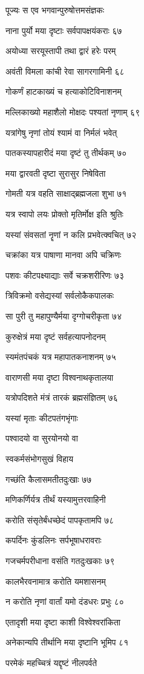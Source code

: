 पूज्यः स एव भगवान्पुरुषोत्तमसंज्ञकः

नाना पुर्यो मया दृष्टाः सर्वपापक्षयंकराः ६७

अयोध्या सरयूस्तापी तथा द्वारं हरेः परम्

अवंती विमला कांची रेवा सागरगामिनी ६८

गोकर्णं हाटकाख्यं च हत्याकोटिविनाशनम्

मल्लिकाख्यो महाशैलो मोक्षदः पश्यतां नृणाम् ६९

यत्रांगेषु नृणां तोयं श्यामं वा निर्मलं भवेत्

पातकस्यापहारीदं मया दृष्टं तु तीर्थकम् ७०

मया द्वारवती दृष्टा सुरासुर निषेविता

गोमती यत्र वहति साक्षाद्ब्रह्मजला शुभा ७१

यत्र स्वापो लयः प्रोक्तो मृतिर्मोक्ष इति श्रुतिः

यस्यां संवसतां नॄणां न कलि प्रभवेत्क्वचित् ७२

चक्रांका यत्र पाषाणा मानवा अपि चक्रिणः

पशवः कीटपक्ष्याद्याः सर्वे चक्रशरीरिणः ७३

त्रिविक्रमो वसेद्यस्यां सर्वलोकैकपालकः

सा पुरी तु महापुण्यैर्मया दृग्गोचरीकृता ७४

कुरुक्षेत्रं मया दृष्टं सर्वहत्यापनोदनम्

स्यमंतपंचकं यत्र महापातकनाशनम् ७५

वाराणसी मया दृष्टा विश्वनाथकृतालया

यत्रोपदिशते मंत्रं तारकं ब्रह्मसंज्ञितम् ७६

यस्यां मृताः कीटपतंगभृंगाः

पश्वादयो वा सुरयोनयो वा

स्वकर्मसंभोगसुखं विहाय

गच्छंति कैलासमतीतदुःखाः ७७

मणिकर्णिर्यत्र तीर्थं यस्यामुत्तरवाहिनी

करोति संसृतेर्बंधच्छेदं पापकृतामपि ७८

कपर्दिनः कुंडलिनः सर्पभूषाधरावराः

गजचर्मपरीधाना वसंति गतदुःखकाः ७९

कालभैरवनामात्र करोति यमशासनम्

न करोति नृणां वार्तां यमो दंडधरः प्रभुः ८०

एतादृशी मया दृष्टा काशी विश्वेश्वरांकिता

अनेकान्यपि तीर्थानि मया दृष्टानि भूमिप ८१

परमेकं महच्चित्रं यद्दृष्टं नीलपर्वते

